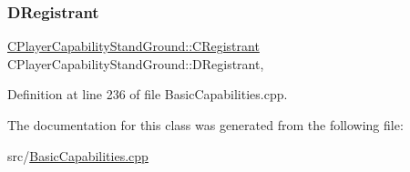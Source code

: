 \subsubsection{\texorpdfstring{D\+Registrant}{DRegistrant}}
{\footnotesize\ttfamily \hyperlink{classCPlayerCapabilityStandGround_1_1CRegistrant}{C\+Player\+Capability\+Stand\+Ground\+::\+C\+Registrant} C\+Player\+Capability\+Stand\+Ground\+::\+D\+Registrant\hspace{0.3cm}{\ttfamily [static]}, {\ttfamily [protected]}}



Definition at line 236 of file Basic\+Capabilities.\+cpp.



The documentation for this class was generated from the following file\+:\begin{DoxyCompactItemize}
\item 
src/\hyperlink{BasicCapabilities_8cpp}{Basic\+Capabilities.\+cpp}\end{DoxyCompactItemize}
